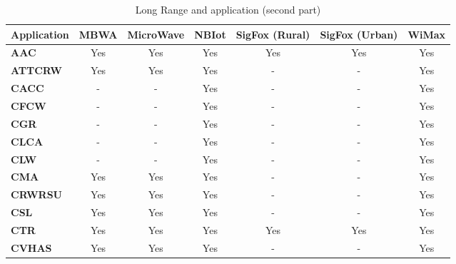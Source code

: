 \FloatBarrier
\begin{table}[ht!]
\centering
\caption{Long Range and application (second part)}
    \label{fig:techandapplong2}
\begin{tabular}{lcccccc}
\hline
\textbf{Application} & \textbf{MBWA} & \textbf{MicroWave} & \textbf{NBIot} & \textbf{SigFox (Rural)} & \textbf{SigFox (Urban)} & \textbf{WiMax} \\
\hline
\textbf{AAC}         & Yes           & Yes                & Yes            & Yes                     & Yes                     & Yes            \\
\textbf{ATTCRW}      & Yes           & Yes                & Yes            & -                       & -                       & Yes            \\
\textbf{CACC}        & -             & -                  & Yes            & -                       & -                       & Yes            \\
\textbf{CFCW}        & -             & -                  & Yes            & -                       & -                       & Yes            \\
\textbf{CGR}         & -             & -                  & Yes            & -                       & -                       & Yes            \\
\textbf{CLCA}        & -             & -                  & Yes            & -                       & -                       & Yes            \\
\textbf{CLW}         & -             & -                  & Yes            & -                       & -                       & Yes            \\
\textbf{CMA}         & Yes           & Yes                & Yes            & -                       & -                       & Yes            \\
\textbf{CRWRSU}      & Yes           & Yes                & Yes            & -                       & -                       & Yes            \\
\textbf{CSL}         & Yes           & Yes                & Yes            & -                       & -                       & Yes            \\
\textbf{CTR}         & Yes           & Yes                & Yes            & Yes                     & Yes                     & Yes            \\
\textbf{CVHAS}       & Yes           & Yes                & Yes            & -                       & -                       & Yes            \\

\end{tabular}
\end{table}
